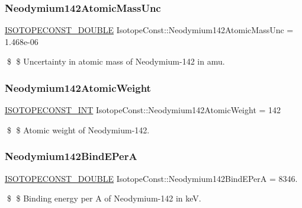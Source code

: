 \subsubsection{\texorpdfstring{Neodymium142\+Atomic\+Mass\+Unc}{Neodymium142AtomicMassUnc}}
{\footnotesize\ttfamily \mbox{\hyperlink{group___isotope_const-_macros_ga8f45a7272ce02c0b4c65c44636ed719a}{I\+S\+O\+T\+O\+P\+E\+C\+O\+N\+S\+T\+\_\+\+D\+O\+U\+B\+LE}} Isotope\+Const\+::\+Neodymium142\+Atomic\+Mass\+Unc = 1.\+468e-\/06}

\$ \$ Uncertainty in atomic mass of Neodymium-\/142 in amu. \mbox{\label{group___isotope_const-_neodymium-_nd142_ga2afd39f8d48a1def3c2942a07a6b0362}} 
\subsubsection{\texorpdfstring{Neodymium142\+Atomic\+Weight}{Neodymium142AtomicWeight}}
{\footnotesize\ttfamily \mbox{\hyperlink{group___isotope_const-_macros_ga5f18360b3e99483a35c32d789e62621c}{I\+S\+O\+T\+O\+P\+E\+C\+O\+N\+S\+T\+\_\+\+I\+NT}} Isotope\+Const\+::\+Neodymium142\+Atomic\+Weight = 142}

\$ \$ Atomic weight of Neodymium-\/142. \mbox{\label{group___isotope_const-_neodymium-_nd142_ga6bb7ed344f50349c8ed1c4ceb6aecd5a}} 
\subsubsection{\texorpdfstring{Neodymium142\+Bind\+E\+PerA}{Neodymium142BindEPerA}}
{\footnotesize\ttfamily \mbox{\hyperlink{group___isotope_const-_macros_ga8f45a7272ce02c0b4c65c44636ed719a}{I\+S\+O\+T\+O\+P\+E\+C\+O\+N\+S\+T\+\_\+\+D\+O\+U\+B\+LE}} Isotope\+Const\+::\+Neodymium142\+Bind\+E\+PerA = 8346.}

\$ \$ Binding energy per A of Neodymium-\/142 in keV. \mbox{\label{group___isotope_const-_neodymium-_nd142_gaf7769a227cedf2baec8ab1a67bfc6145}} 
